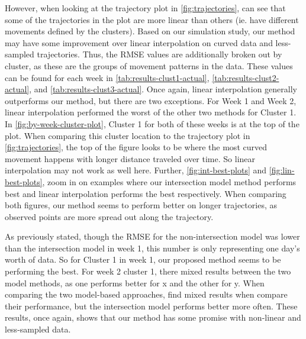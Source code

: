 \documentclass[12pt]{article}
\begin{document}
However, when looking at the trajectory plot in \cref{fig:trajectories},
can see that some of the trajectories in the plot are more linear than
others (ie. have different movements defined by the clusters). Based on
our simulation study, our method may have some improvement over linear
interpolation on curved data and less-sampled trajectories. Thus, the
RMSE values are additionally broken out by cluster, as these are the
groups of movement patterns in the data. These values can be found for
each week in \cref{tab:results-clust1-actual},
\cref{tab:results-clust2-actual}, and \cref{tab:results-clust3-actual}.
Once again, linear interpolation generally outperforms our method, but
there are two exceptions. For Week 1 and Week 2, linear interpolation
performed the worst of the other two methods for Cluster 1. In
\cref{fig:by-week-cluster-plot}, Cluster 1 for both of these weeks is at
the top of the plot. When comparing this cluster location to the
trajectory plot in \cref{fig:trajectories}, the top of the figure looks
to be where the most curved movement happens with longer distance
traveled over time. So linear interpolation may not work as well here.
Further, \cref{fig:int-best-plots} and \cref{fig:lin-best-plots}, zoom
in on examples where our intersection model method performs best and
linear interpolation performs the best respectively. When comparing both
figures, our method seems to perform better on longer trajectories, as
observed points are more spread out along the trajectory.

As previously stated, though the RMSE for the non-intersection model was
lower than the intersection model in week 1, this number is only
representing one day's worth of data. So for Cluster 1 in week 1, our
proposed method seems to be performing the best. For week 2 cluster 1,
there mixed results between the two model methods, as one performs
better for x and the other for y. When comparing the two model-based
approaches, find mixed results when compare their performance, but the
intersection model performs better more often. These results, once
again, shows that our method has some promise with non-linear and
less-sampled data.
\end{document}
